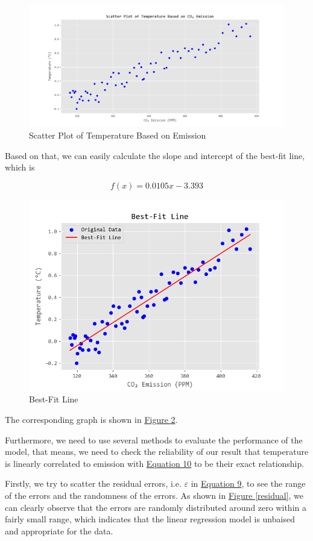 \documentclass[12pt,a4paper]{article}
\begin{document}
    \begin{figure}[htbp]
        \centering
        \includegraphics[width=1\linewidth]{img/scatter temp.png}
        \caption{Scatter Plot of Temperature Based on  Emission}
        \label{scatter_temp}
    \end{figure}

    Based on that, we can easily calculate the slope and intercept of the best-fit line, which is
    
    \begin{equation}\label{10}
        f(x)=0.0105x-3.393
    \end{equation}
    
    \begin{figure}[htbp]
        \centering
        \includegraphics[width=0.5\linewidth]{img/best-fit line.png}
        \caption{Best-Fit Line}
        \label{bestfit}
    \end{figure}
    
    The corresponding graph is shown in \hyperref[bestfit]{Figure \ref*{bestfit}}.

    Furthermore, we need to use several methods to evaluate the performance of the model, that means, we need to check the reliability of our result that temperature is linearly correlated to  emission with \hyperref[10]{Equation 10} to be their exact relationship.

    Firstly, we try to scatter the residual errors, i.e. $\varepsilon$ in \hyperref[9]{Equation 9}, to see the range of the errors and the randomness of the errors. As shown in \hyperref[residual]{Figure \ref*{residual}}, we can clearly observe that the errors are randomly distributed around zero within a fairly small range, which indicates that the linear regression model is unbaised and appropriate for the data.
\end{document}
